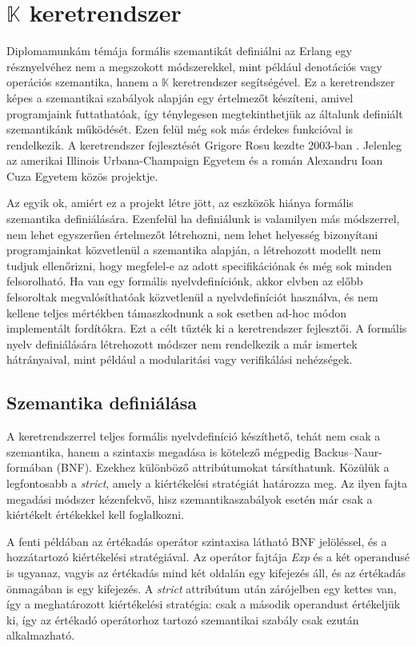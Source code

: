 \section{$\mathbb{K}$ keretrendszer}

Diplomamunkám témája formális szemantikát definiálni az Erlang egy résznyelvéhez nem a megszokott módszerekkel, mint például denotációs vagy operációs szemantika, hanem a $\mathbb{K}$ keretrendszer segítségével. Ez a keretrendszer képes a szemantikai szabályok alapján egy értelmezőt készíteni, amivel programjaink futtathatóak, így ténylegesen megtekinthetjük az általunk definiált szemantikánk működését. Ezen felül még sok más érdekes funkcióval is rendelkezik. A keretrendszer fejlesztését Grigore Rosu kezdte 2003-ban \cite{KLecture}. Jelenleg az amerikai Illinois Urbana-Champaign Egyetem és a román Alexandru Ioan Cuza Egyetem közös projektje.

Az egyik ok, amiért ez a projekt létre jött, az eszközök hiánya formális szemantika definiálására. Ezenfelül ha definiálunk is valamilyen más módszerrel, nem lehet egyszerűen értelmezőt létrehozni, nem lehet helyesség bizonyítani programjainkat közvetlenül a szemantika alapján, a létrehozott modellt nem tudjuk ellenőrizni, hogy megfelel-e az adott specifikációnak és még sok minden felsorolható. Ha van egy formális nyelvdefiníciónk, akkor elvben az előbb felsoroltak megvalósíthatóak közvetlenül a nyelvdefiníciót használva, és nem kellene teljes mértékben támaszkodnunk a sok esetben ad-hoc módon implementált fordítókra. Ezt a célt tűzték ki a keretrendszer fejlesztői. A formális nyelv definiálására létrehozott módszer nem rendelkezik a már ismertek hátrányaival, mint például a modularitási vagy verifikálási nehézségek.

\subsection{Szemantika definiálása}

A keretrendszerrel teljes formális nyelvdefiníció készíthető, tehát nem csak a szemantika, hanem a szintaxis megadása is kötelező mégpedig Backus–Naur-formában (BNF). Ezekhez különböző attribútumokat társíthatunk. Közülük a legfontosabb a \textit{strict}, amely a kiértékelési stratégiát határozza meg. Az ilyen fajta megadási módszer kézenfekvő, hisz szemantikaszabályok esetén már csak a kiértékelt értékekkel kell foglalkozni.



A fenti példában az értékadás operátor szintaxisa látható BNF jelöléssel, és a hozzátartozó kiértékelési stratégiával. Az operátor fajtája \textit{Exp} és a két operandusé is ugyanaz, vagyis az értékadás mind két oldalán egy kifejezés áll, és az értékadás önmagában is egy kifejezés. A \textit{strict} attribútum után zárójelben egy kettes van, így a meghatározott kiértékelési stratégia: csak a második operandust értékeljük ki, így az értékadó operátorhoz tartozó szemantikai szabály csak ezután alkalmazható.

